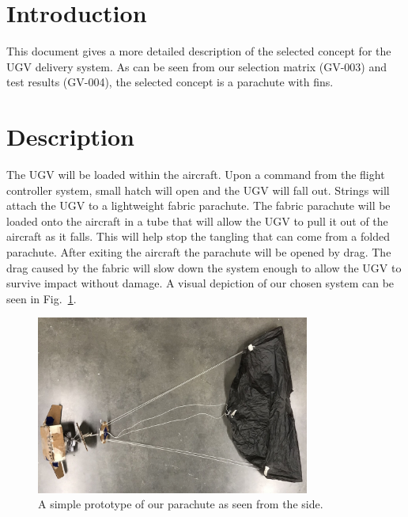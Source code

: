 \documentclass[]{auvsi_doc}
\begin{document}
\begin{AUVSITitlePage}
\begin{artifacttable}
\end{artifacttable}
\end{AUVSITitlePage}

\section{Introduction}
This document gives a more detailed description of the selected concept for the UGV delivery system. As can be seen from our selection matrix (GV-003) and test results (GV-004), the selected concept is a parachute with fins.

\section{Description}

The UGV will be loaded within the aircraft. Upon a command from the flight controller system, small hatch will open and the UGV will fall out. Strings will attach the UGV to a lightweight fabric parachute. The fabric parachute will be loaded onto the aircraft in a tube that will allow the UGV to pull it out of the aircraft as it falls. This will help stop the tangling that can come from a folded parachute. After exiting the aircraft the parachute will be opened by drag. The drag caused by the fabric will slow down the system enough to allow the UGV to survive impact without damage. A visual depiction of our chosen system can be seen in Fig.~\ref{fig:side}.

\begin{figure}[h]
\centering
\includegraphics[width=90mm]{./figs/Parachute_Side.jpg}
\caption{A simple prototype of our parachute as seen from the side.}
\label{fig:side}
\end{figure}
\end{document}
